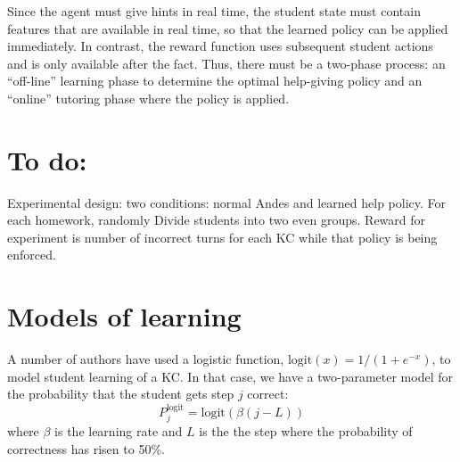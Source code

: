 \documentclass[11pt,letterpaper]{article}
\begin{document}
Since the agent must give hints in real time, the student state
must contain features that are available in real time, so that
the learned policy can be applied immediately.  In contrast,
the reward function uses subsequent student actions and is only
available after the fact.  Thus, there must be a two-phase process:
an ``off-line'' learning phase to determine the optimal help-giving 
policy and an ``online'' tutoring phase where the policy is applied.




\section*{To do:}

Experimental design:  two conditions: normal Andes and learned
help policy.  For each homework, randomly Divide students into two 
even groups.  Reward for experiment is number of incorrect turns
for each KC while that policy is being enforced.



\section{Models of learning}

A number of authors have used a logistic function, 
$\mathrm{logit}(x)=1/\left(1+e^{-x}\right)$, to 
model student learning of a KC.  In that case, we have a two-parameter
model for the probability that the student gets step $j$ correct:
%
\begin{equation}
               P_j^\mathrm{logit} = \mathrm{logit}\left(\beta (j-L)\right)
\end{equation}
%
where $\beta$ is the learning rate and $L$ is 
the the step where the probability of correctness has risen to 50\%.
\end{document}
